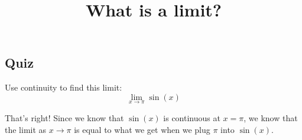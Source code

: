 \documentclass{ximera}
\title{What is a limit?}
\begin{document}
\begin{abstract}
\end{abstract}

\subsection{Quiz}

\begin{question}
Use continuity to find this limit: \[ \lim_{x \to \pi} \sin(x) \]
\begin{multipleChoice}  
\end{multipleChoice}  

\begin{explanation}
    That's right! Since we know that $\sin(x)$ is continuous at $x = \pi$, we know that the limit as $x \to \pi$ is equal to what we get when we plug $\pi$ into $\sin(x)$.
\end{explanation}
\end{question}
\end{document}
